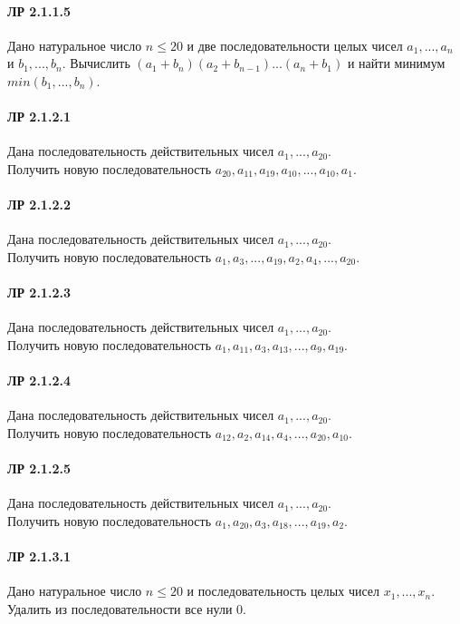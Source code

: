 \documentclass[12pt,a4paper]{report}
\begin{document}
\paragraph*{ЛР 2.1.1.5} Дано натуральное число $n \le 20$ и две последовательности целых чисел $a_1, ..., a_n$ и $b_1, ..., b_n$. Вычислить $(a_1 + b_n)(a_2 + b_{n-1}) ... (a_n + b_1)$ и найти минимум $min(b_1, ..., b_n)$.

\paragraph*{ЛР 2.1.2.1} Дана последовательность действительных чисел $a_1, ..., a_{20}$. \\
Получить новую последовательность $a_{20}, a_{11}, a_{19}, a_{10}, ..., a_{10}, a_1$.
\paragraph*{ЛР 2.1.2.2} Дана последовательность действительных чисел $a_1, ..., a_{20}$. \\
Получить новую последовательность  $a_1, a_3, ..., a_{19}, a_2, a_4, ..., a_{20}$.
\paragraph*{ЛР 2.1.2.3} Дана последовательность действительных чисел $a_1, ..., a_{20}$. \\
Получить новую последовательность  $a_1, a_{11}, a_3, a_{13}, ..., a_9, a_{19}$.
\paragraph*{ЛР 2.1.2.4} Дана последовательность действительных чисел $a_1, ..., a_{20}$. \\
Получить новую последовательность  $a_{12}, a_2, a_{14}, a_4, ..., a_{20}, a_{10}$.
\paragraph*{ЛР 2.1.2.5} Дана последовательность действительных чисел $a_1, ..., a_{20}$. \\
Получить новую последовательность  $a_1, a_{20}, a_3, a_{18}, ..., a_{19}, a_2$.

\clearpage
\paragraph*{ЛР 2.1.3.1} Дано натуральное число $n \le 20$ и последовательность целых чисел $x_1, ..., x_n$. Удалить из последовательности все нули $0$.
\end{document}

